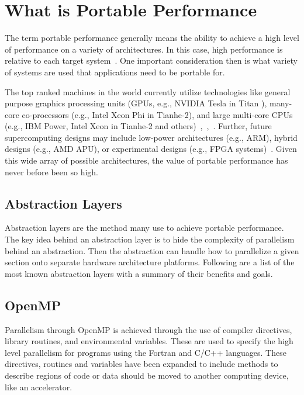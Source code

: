 \section{\textbf{What is Portable Performance}}

The term portable performance generally means the ability to achieve a high level of performance on a variety of architectures.
%
In this case, high performance is relative to each target system~\cite{michaelwolfe2016}.
%
One important consideration then is what variety of systems are used that applications need to be portable for. 
%

%
The top ranked machines in the world currently utilize technologies like general purpose graphics processing units (GPUs, e.g., NVIDIA Tesla in Titan ), many-core co-processors (e.g., Intel Xeon Phi in Tianhe-2), and large multi-core CPUs (e.g., IBM Power, Intel Xeon in Tianhe-2 and others)~\cite{michaelwolfe2016},~\cite{top500thelist2016},~\cite{hankchilds2015}. 
%
Further, future supercomputing designs may include low-power architectures (e.g., ARM), hybrid designs (e.g., AMD APU), or experimental designs (e.g., FPGA systems)~\cite{hankchilds2015}. 
%
Given this wide array of possible architectures, the value of portable performance has never before been so high.
%

\subsection{ \textbf{Abstraction Layers}}

Abstraction layers are the method many use to achieve portable performance.
%
The key idea behind an abstraction layer is to hide the complexity of parallelism behind an abstraction.
%
Then the abstraction can handle how to parallelize a given section onto separate hardware architecture platforms.
%
Following are a list of the most known abstraction layers with a summary of their benefits and goals.

\subsection*{\textbf{OpenMP}}

Parallelism through OpenMP is achieved through the use of compiler directives, library routines, and environmental variables.
%
These are used to specify the high level parallelism for programs using the Fortran and C/C++ languages.
%
These directives, routines and variables have been expanded to include methods to describe regions of code or data should be moved to another computing device, like an accelerator.~\cite{openmp}

